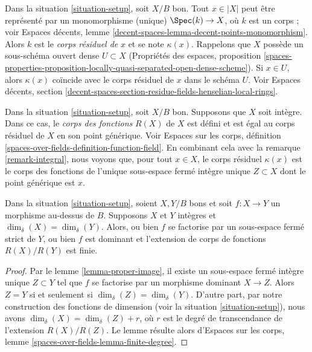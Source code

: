 \begin{remark}
\label{remark-residue-field}
Dans la situation \ref{situation-setup}, soit $X/B$ bon. Tout $x \in
|X|$ peut être représenté par un monomorphisme (unique) $\Spec(k) \to X$, où
$k$ est un corps ; voir Espaces décents, lemme
\ref{decent-spaces-lemma-decent-points-monomorphism}. Alors $k$ est le {\it
corps résiduel de} $x$ et se note $\kappa(x)$. Rappelons que $X$ possède un
sous-schéma ouvert dense $U \subset X$ (Propriétés des espaces, proposition
\ref{spaces-properties-proposition-locally-quasi-separated-open-dense-scheme}).
Si $x \in U$, alors $\kappa(x)$ coïncide avec le corps résiduel de $x$
dans le schéma $U$. Voir Espaces décents, section
\ref{decent-spaces-section-residue-fields-henselian-local-rings}.
\end{remark}

\begin{remark}
\label{remark-function-field}
Dans la situation \ref{situation-setup}, soit $X/B$ bon. Supposons que
$X$ soit intègre. Dans ce cas, le {\it corps des fonctions} $R(X)$ de $X$ est
défini et est égal au corps résiduel de $X$ en son point générique. Voir
Espaces sur les corps, définition
\ref{spaces-over-fields-definition-function-field}. En combinant cela avec la
remarque \ref{remark-integral}, nous voyons que, pour tout $x \in X$, le
corps résiduel $\kappa(x)$ est le corps des fonctions de l'unique sous-espace fermé
intègre unique $Z \subset X$ dont le point générique est $x$.
\end{remark}

\begin{lemma}
\label{lemma-equal-dimension}
Dans la situation \ref{situation-setup}, soient $X, Y/B$ bons et soit $f : X
\to Y$ un morphisme au-dessus de $B$. Supposons $X$ et $Y$ intègres et
$\dim_\delta(X) = \dim_\delta(Y)$. Alors, ou bien $f$ se factorise par un
sous-espace fermé strict de $Y$, ou bien $f$ est dominant et l'extension de
corps de fonctions $R(X) / R(Y)$ est finie.
\end{lemma}

\begin{proof}
Par le lemme \ref{lemma-proper-image}, il existe un sous-espace fermé intègre
unique $Z \subset Y$ tel que $f$ se factorise par un morphisme dominant $X
\to Z$. Alors $Z = Y$ si et seulement si $\dim_\delta(Z) = \dim_\delta(Y)$.
D'autre part, par notre construction des fonctions de dimension (voir la
situation \ref{situation-setup}), nous avons $\dim_\delta(X) =
\dim_\delta(Z) + r$, où $r$ est le degré de transcendance de l'extension
$R(X)/R(Z)$. Le lemme résulte alors d'Espaces sur les corps, lemme
\ref{spaces-over-fields-lemma-finite-degree}.
\end{proof}

